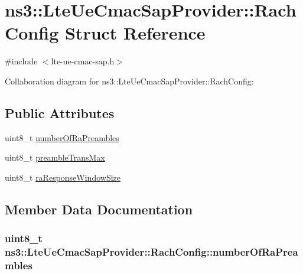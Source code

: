 \hypertarget{structns3_1_1LteUeCmacSapProvider_1_1RachConfig}{}\section{ns3\+:\+:Lte\+Ue\+Cmac\+Sap\+Provider\+:\+:Rach\+Config Struct Reference}
\label{structns3_1_1LteUeCmacSapProvider_1_1RachConfig}


{\ttfamily \#include $<$lte-\/ue-\/cmac-\/sap.\+h$>$}



Collaboration diagram for ns3\+:\+:Lte\+Ue\+Cmac\+Sap\+Provider\+:\+:Rach\+Config\+:
\subsection*{Public Attributes}
\begin{DoxyCompactItemize}
\item 
uint8\+\_\+t \hyperlink{structns3_1_1LteUeCmacSapProvider_1_1RachConfig_a452f85939ef0c151ad4d845a190d5324}{number\+Of\+Ra\+Preambles}
\item 
uint8\+\_\+t \hyperlink{structns3_1_1LteUeCmacSapProvider_1_1RachConfig_a38393266a15affdc58b861f7b8e35aee}{preamble\+Trans\+Max}
\item 
uint8\+\_\+t \hyperlink{structns3_1_1LteUeCmacSapProvider_1_1RachConfig_a1a14230a2498262be3a985604ce5eaf0}{ra\+Response\+Window\+Size}
\end{DoxyCompactItemize}


\subsection{Member Data Documentation}
\subsubsection[{\texorpdfstring{number\+Of\+Ra\+Preambles}{numberOfRaPreambles}}]{\setlength{\rightskip}{0pt plus 5cm}uint8\+\_\+t ns3\+::\+Lte\+Ue\+Cmac\+Sap\+Provider\+::\+Rach\+Config\+::number\+Of\+Ra\+Preambles}\hypertarget{structns3_1_1LteUeCmacSapProvider_1_1RachConfig_a452f85939ef0c151ad4d845a190d5324}{}\label{structns3_1_1LteUeCmacSapProvider_1_1RachConfig_a452f85939ef0c151ad4d845a190d5324}

